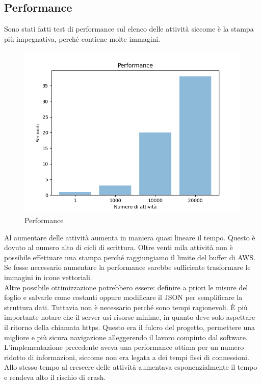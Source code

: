 \documentclass[12pt]{article}
\begin{document}
\subsection{Performance}
Sono stati fatti test di performance sul elenco delle attività siccome è la 
stampa più impegnativa, perché contiene molte immagini.  
\begin{figure}[H]
\includegraphics[width =\textwidth]{performance.png}
\caption{Performance}
\end{figure}
Al aumentare delle attività aumenta in maniera quasi lineare il tempo. Questo 
è dovuto al numero alto di cicli di scrittura.
Oltre venti mila attività non è possibile effettuare una stampa perché 
raggiungiamo il limite del buffer di AWS. Se fosse necessario aumentare 
la performance sarebbe sufficiente trasformare le immagini in icone vettoriali.
\\ Altre possibile ottimizzazione potrebbero essere: definire a priori le 
misure del foglio e salvarle come costanti oppure modificare il JSON per 
semplificare la struttura dati. 
Tuttavia non è necessario perché sono tempi ragionevoli.
È più importante notare che il server usi risorse minime, in quanto deve 
solo aspettare il ritorno della chiamata https. Questo era il fulcro del progetto, 
permettere una migliore e più sicura navigazione alleggerendo il lavoro compiuto 
dal software.
\\ L'implementazione precedente aveva una performance ottima per un numero ridotto 
di informazioni, 
siccome non era legata a dei tempi fissi di connessioni. Allo stesso tempo al 
crescere delle attività aumentava esponenzialmente il tempo e rendeva alto il 
rischio di crash.
\end{document}
